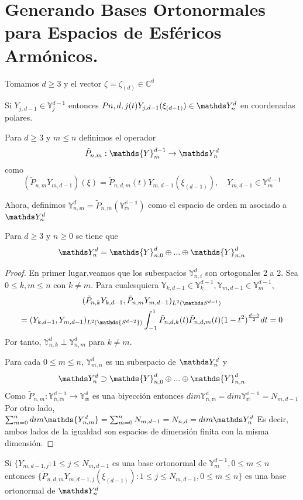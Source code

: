 \section{Generando Bases Ortonormales para Espacios de Esféricos Armónicos.}
Tomamos $d\ge3$ y el vector $\zeta = \zeta_{(d)} \in \mathds{C^{d}}$ 
\begin{prop}Si $Y_{j,d-1}\in\mathds{Y}_j^{d-1}$ entonces $P{n,d,j}(t)Y_{j,d-1}(\xi_{(d-1)})\in\spharm$ en coordenadas polares.
\end{prop}
\begin{defn}
Para $d\ge3$ y $m\le n$ definimos el operador $$ \tilde{P}_{n,m} : \mathds{Y}_m^{d-1} \to \spharm
$$
como
$$
(\tilde{P}_{n,m}Y_{m,d-1})(\xi) = \tilde{P}_{n,d,m}(t)Y_{m,d-1}(\xi_{(d-1)}), \quad Y_{m,d-1} \in \mathds{Y}_m^{d-1}
$$
\end{defn}
Ahora, definimos $\mathds{Y}^d_{n,m} = \tilde{P}_{n,m}(\mathds{Y_{m}^{d-1}})$ como el espacio de orden m asociado a $\spharm$
\begin{thm}Para $d\ge 3$ y $n\ge 0$ se tiene que $$
	\spharm = \mathds{Y}^d_{n,0} \oplus ... \oplus \mathds{Y}^d_{n,n}
$$
\end{thm}
\begin{proof}
En primer lugar,veamos que los subespacios $\mathds{Y}^d_{n,i}$ son ortogonales 2 a 2. Sea $0\le k,m\le n$ con $k \neq m$. Para cualesquiera $\mathds{Y}_{k,d-1}\in\mathds{Y}_k^{d-1},\mathds{Y}_{m,d-1}\in\mathds{Y}_m^{d-1}$,
\begin{gather}
(\tilde{P}_{n,k}Y_{k,d-1},\tilde{P}_{n,m}Y_{m,d-1})_{L^2(\sphere)} \\= (Y_{k,d-1},Y_{m,d-1})_{L^2(\mathds{S^{d-2}})}\int_{-1}^{1} \tilde{P}_{n,d,k}(t)\tilde{P}_{n,d,m}(t)(1-t^2)^{\frac{d-3}{2}}dt = 0
\end{gather}
Por tanto, $\mathds{Y}^d_{n,k}\perp\mathds{Y}^d_{n,m}$ para $k\neq m$.

Para cada $0\le m\le n$, $\mathds{Y}^d_{m,n}$ es un subespacio de $\spharm$ y $$
\spharm \supset \mathds{Y}^d_{n,0} \oplus ... \oplus \mathds{Y}^d_{n,n}$$
Como $\tilde{P}_{n,m}:\mathds{Y_{n,m}^{d-1}} \to \mathds{Y_{m}^{d}}$ es una biyección entonces $dim \mathds{Y_{n,m}^{d}} = dim \mathds{Y_{m}^{d-1}} = N_{m,d-1}$
Por otro lado, $\sum_{m=0}^{n} dim \mathds{Y_{n,m}^{d}} = \sum_{m=0}^{n} N_{m,d-1} =  N_{n,d} = dim \spharm$
Es decir, ambos lados de la igualdad son espacios de dimensión finita con la misma dimensión.
\end{proof}
\begin{rem}Si $\{Y_{m,d-1,j}:1\le j \le N_{m,d-1}$ es una base ortonormal de $\mathds{Y}_m^{d-1}, 0\le m\le n$ entonces $\{\tilde{P}_{n,d,m}Y_{m,d-1,j}(\xi_{(d-1)}):1\le j \le N_{m,d-1}, 0\le m \le n\}$ es una base ortonormal de $\spharm$
\end{rem}
\appendix
